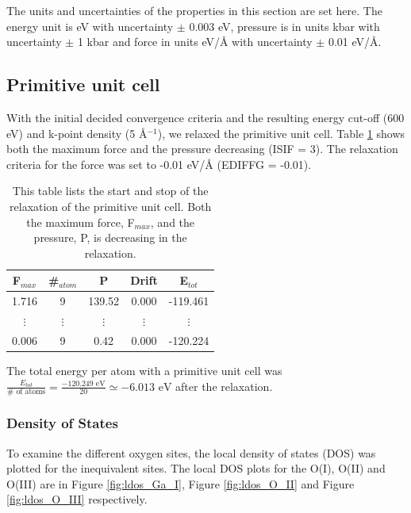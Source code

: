 The units and uncertainties of the properties in this section are set here. The energy unit is eV with uncertainty $\pm$ 0.003 eV, pressure is in units kbar with uncertainty $\pm$ 1 kbar and force in units eV/Å with uncertainty $\pm$ 0.01 eV/Å.


\subsection{Primitive unit cell}

With the initial decided convergence criteria and the resulting energy cut-off (600 eV) and k-point density (5 Å$^{-1}$), we relaxed the primitive unit cell. Table \ref{tab:ionstep_primitive} shows both the maximum force and the pressure decreasing (ISIF = 3). The relaxation criteria for the force was set to -0.01 eV/Å (EDIFFG = -0.01).

\begin{table}[H]\caption{This table lists the start and stop of the relaxation of the primitive unit cell. Both the maximum force, F$_{max}$, and the pressure, P, is decreasing in the relaxation.}\label{tab:ionstep_primitive}
\begin{tabular}{ccccc}
F$_{max}$ &\#$_{atom}$&	P&	Drift&	E$_{tot}$\\ \hline
1.716&	9&	139.52&	0.000&	-119.461\\
$\vdots$&$\vdots$&$\vdots$&$\vdots$&$\vdots$\\
0.006&	9&	0.42&	0.000&	-120.224\\
\end{tabular}
\end{table}

The total energy per atom with a primitive unit cell was $\frac{E_{tot}}{\# \text{ of atoms}} = \frac{-120.249 \text{ eV}}{20} \simeq -6.013 \text{ eV}$ after the relaxation.

\subsubsection{Density of States}

To examine the different oxygen sites, the local density of states (DOS) was plotted for the inequivalent sites. The local DOS plots for the O(I), O(II) and O(III) are in Figure \ref{fig:ldos_Ga_I}, Figure \ref{fig:ldos_O_II} and Figure \ref{fig:ldos_O_III} respectively.

